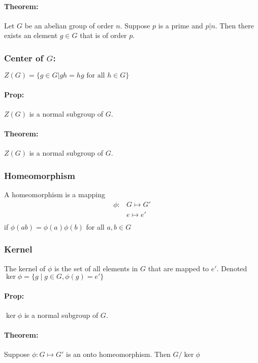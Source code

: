\documentclass[11pt, twoside, letterpaper]{article}
\begin{document}
\paragraph{Theorem: }
	Let $G$ be an abelian group of order $n$.
	Suppose $p$ is a prime and $p | n$.
	Then there exists an element $g \in G$ that is of order $p$.

\subsubsection{Center of $G$:}
 	$Z(G) = \{ g \in G | gh = hg \text{ for all } h \in G\}$ \\

	\paragraph{Prop: }
		$Z(G)$ is a normal subgroup of $G$.

\paragraph{Theorem: }
	$Z(G)$ is a normal subgroup of $G$.

\subsubsection{Homeomorphism}
	A homeomorphism is a mapping
	\begin{align*}
		\phi: &G \mapsto G' \\
		&e \mapsto e '\\
	\end{align*}
	if $\phi(ab) = \phi(a) \phi(b)$ for all $a, b \in G$


\subsubsection{Kernel}
	The kernel of $\phi$ is the set of all elements in $G$ that are mapped to $e'$.
	Denoted $\ker \phi = \{ g \mid g \in G, \phi(g) = e' \} $

\paragraph{Prop: }
$\ker \phi$ is a normal subgroup of $G$.

\paragraph{Theorem: }
	Suppose $\phi: G \mapsto G'$ is an onto homeomorphism.
	Then $G/\ker\phi $
\end{document}
